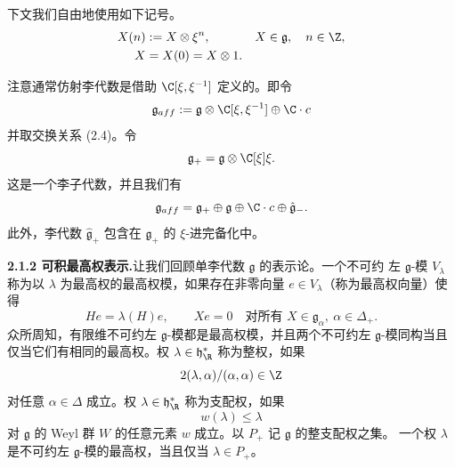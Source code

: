 下文我们自由地使用如下记号。
\begin{align*}
X(n)&:=X\otimes\xi^{n}, & X&\in\mathfrak{g},\quad n\in\Z,\\
X&=X(0)=X\otimes 1.
\end{align*}

\begin{remark}[2.3]
注意通常仿射李代数是借助 $\C[\xi,\xi^{-1}]$ 定义的。即令
\[
\mathfrak{g}_{aff}:=\mathfrak{g}\otimes\C[\xi,\xi^{-1}]\oplus\C\cdot c
\]
并取交换关系 (2.4)。令
\[
\mathfrak{g}_+=\mathfrak{g}\otimes\C[\xi]\xi.
\]
这是一个李子代数，并且我们有
\[
\mathfrak{g}_{aff}=\mathfrak{g}_+\oplus\mathfrak{g}\oplus\C\cdot c\oplus\hat{\mathfrak{g}}_-.
\]
此外，李代数 $\hat{\mathfrak{g}}_+$ 包含在 $\mathfrak{g}_+$ 的 $\xi$-进完备化中。
\end{remark}


\noindent\textbf{2.1.2 可积最高权表示.}\quad 让我们回顾单李代数 $\mathfrak{g}$ 的表示论。一个不可约
左 $\mathfrak{g}$-模 $V_{\lambda}$ 称为以 $\lambda$ 为最高权的最高权模，如果存在非零向量
$e\in V_{\lambda}$（称为最高权向量）使得
\[
He=\lambda(H)e,\qquad Xe=0\quad\text{对所有 }X\in\mathfrak{g}_{\alpha},\ \alpha\in\Delta_+.
\]
众所周知，有限维不可约左 $\mathfrak{g}$-模都是最高权模，并且两个不可约左 $\mathfrak{g}$-模同构当且
仅当它们有相同的最高权。权 $\lambda\in\mathfrak{h}^*_{\R}$ 称为整权，如果
\[
2(\lambda,\alpha)/(\alpha,\alpha)\in\Z
\]
对任意 $\alpha\in\Delta$ 成立。权 $\lambda\in\mathfrak{h}^*_{\R}$ 称为支配权，如果
\[
w(\lambda)\le\lambda
\]
对 $\mathfrak{g}$ 的 Weyl 群 $W$ 的任意元素 $w$ 成立。以 $P_+$ 记 $\mathfrak{g}$ 的整支配权之集。
一个权 $\lambda$ 是不可约左 $\mathfrak{g}$-模的最高权，当且仅当 $\lambda\in P_+$。

